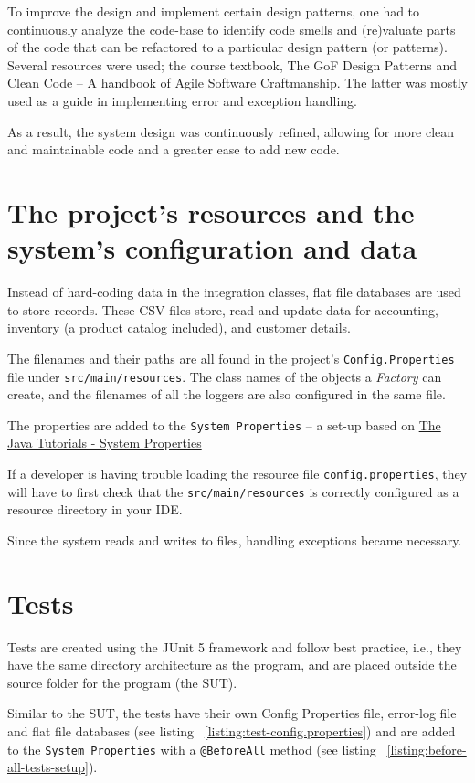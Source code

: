 \documentclass[a4paper]{scrreprt}
\begin{document}
To improve the design and implement certain design patterns,
one had to continuously analyze the code-base to identify code smells and
(re)valuate parts of the code that can be refactored to a
particular design pattern (or patterns).
Several resources were used; the course textbook, The GoF Design Patterns
and Clean Code -- A handbook of Agile Software Craftmanship.
The latter was mostly used as a guide in implementing error and exception handling.

As a result, the system design was continuously refined,
allowing for more clean and maintainable code and a greater ease to add new code.

\section*{The project's resources and the system's configuration and data}
\label{sec:resources}
Instead of hard-coding data in the integration classes,
flat file databases are used to store records.
These CSV-files store,
read and update data for accounting, inventory (a product catalog included), and customer details.

The filenames and their paths are all found in the project's \verb|Config.Properties|
file under \verb|src/main/resources|.
The class names of the objects a \emph{Factory} can create, and the filenames of all the loggers are also
configured in the same file.

The properties are added to the \verb|System Properties| -- a set-up based on
\href{https://docs.oracle.com/javase/tutorial/essential/environment/sysprop.html}{The Java\texttrademark{} Tutorials - System Properties}

If a developer is having trouble loading the resource file \verb|config.properties|,
they will have to first check that the \verb|src/main/resources|
is correctly configured as a resource directory in your IDE.

Since the system reads and writes to files, handling exceptions became necessary.

\section*{Tests}
Tests are created using the JUnit 5 framework and follow best practice, i.e., they
have the same directory architecture as the program, and are placed outside the source
folder for the program (the SUT).

Similar to the SUT, the tests have their own Config Properties file, error-log file and flat file databases
(see listing ~\ref{listing:test-config.properties}) and are added to the \verb|System Properties| with
a \texttt{@BeforeAll} method (see listing ~\ref{listing:before-all-tests-setup}).
\end{document}
